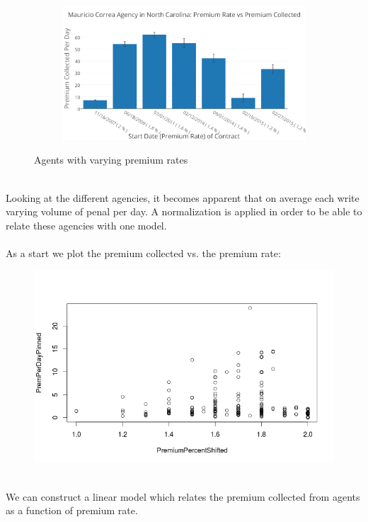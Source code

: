 \documentclass{article}
\begin{document}
\begin{center}
\begin{figure}[H]
\begin{subfigure}[b]{0.5\textwidth}
\end{subfigure}
\begin{subfigure}[b]{0.5\textwidth}
\includegraphics[width=\textwidth]{Mauricio_Correa_Agency_in_North_Carolina-_Premium_Rate_vs_Premium_Collected.png}
\end{subfigure}
\caption{Agents with varying premium rates}
\end{figure}
\end{center}
~\\
Looking at the different agencies, it becomes apparent that on average each write varying volume of penal per day.
A normalization is applied in order to be able to relate these agencies with one model.
~\\
~\\
As a start we plot the premium collected vs. the premium rate:

\begin{figure}[H]
\centering
\includegraphics[width=0.45\paperwidth]{premPinnedNoLine.png}
\end{figure}
~\\
We can construct a linear model which relates the premium collected from agents as a function of premium rate.
\end{document}
